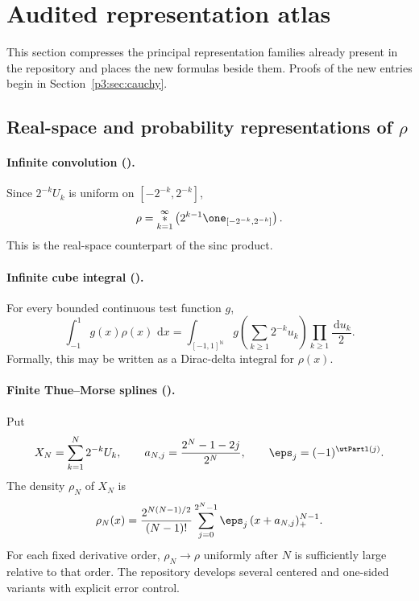 \documentclass[11pt,oneside]{article}
\theoremstyle{definition}
\newcommand{\dd}{\,\mathrm d}
\newcommand{\N}{\mathbb N}
\begin{document}
\section{Audited representation atlas}

This section compresses the principal representation families already present in the
repository and places the new formulas beside them.  Proofs of the new entries begin in
Section~\ref{p3:sec:cauchy}.

\subsection{Real-space and probability representations of \(\rho\)}

\paragraph{Infinite convolution (\statusknownPartl).}
Since \(2^{-k}U_k\) is uniform on \([-2^{-k},2^{-k}]\),
\begin{equation}
 \rho=\mathop{\ast}_{k=1}^{\infty}
 \left(2^{k-1}\one_{[-2^{-k},2^{-k}]}\right).                \label{p3:eq:rho-convolution}
\end{equation}
This is the real-space counterpart of the sinc product.

\paragraph{Infinite cube integral (\statusderivedPartl).}
For every bounded continuous test function \(g\),
\begin{equation}
 \int_{-1}^{1}g(x)\rho(x)\,\dd x
 =\int_{[-1,1]^{\N}}g\!\left(\sum_{k\ge1}2^{-k}u_k\right)
   \prod_{k\ge1}\frac{\dd u_k}{2}.                           \label{p3:eq:cube-pushforward}
\end{equation}
Formally, this may be written as a Dirac-delta integral for \(\rho(x)\).

\paragraph{Finite Thue--Morse splines (\statusknownPartl).}
Put
\begin{equation}
 X_N=\sum_{k=1}^{N}2^{-k}U_k,
 \qquad
 a_{N,j}=\frac{2^N-1-2j}{2^N},
 \qquad
 \eps_j=(-1)^{\wtPartl(j)}.                                      \label{p3:eq:aNj}
\end{equation}
The density \(\rho_N\) of \(X_N\) is
\begin{equation}
 \rho_N(x)=\frac{2^{N(N-1)/2}}{(N-1)!}
 \sum_{j=0}^{2^N-1}\eps_j\,(x+a_{N,j})_+^{N-1}.             \label{p3:eq:finite-spline}
\end{equation}
For each fixed derivative order, \(\rho_N\to\rho\) uniformly after \(N\) is sufficiently
large relative to that order.  The repository develops several centered and one-sided
variants with explicit error control.
\end{document}
